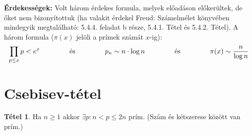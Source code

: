 \documentclass[12pt]{book}
\theoremstyle{plain} %
\theoremstyle{definition} %
\newtheorem{theo/}{Tétel}[section]
\newenvironment{theo}
  {\renewcommand{\qedsymbol}{$\clubsuit$}%
   \pushQED{\qed}\begin{theo/}}
  {\popQED\end{theo/}}
\theoremstyle{remark}
\renewcommand\qedsymbol{$\blacksquare$}
\numberwithin{equation}{section}  %
\begin{document}
	\textbf{Érdekességek:} Volt három érdekes formula, melyek előadáson előkerültek, de őket nem bizonyítottuk (ha valakit érdekel Freud: Számelmélet könyvében mindegyik megtalálható: 5.4.4. feladat b része, 5.4.1. Tétel és 5.4.2. Tétel). A három formula ($\pi(x)$ jelöli a prímek számát $x$-ig):
	\[ \prod\limits_{p\leq x} p < e^x  \hspace{15mm} \text{és} \hspace{15mm} p_n \sim n\cdot \log n \hspace{15mm} \text{és} \hspace{15mm} \pi(x) \sim \dfrac{n}{\log n} \]
	
	\section{Csebisev-tétel}
	
	\begin{theo}
		Ha $n\geq1$ akkor $\exists p: n < p \leq 2n$ prím. (Szám és kétszerese között van prím.)
	\end{theo}
\end{document}
